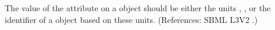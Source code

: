 The value of the attribute  on a \Model object should be
either the units , , or the identifier of a
\UnitDefinition object based on these units.  (References: SBML L3V2
.)
